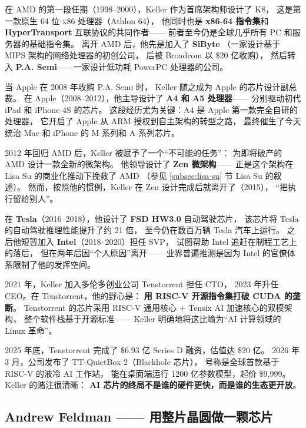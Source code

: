 在 AMD 的第一段任期（1998--2000），Keller 作为首席架构师设计了 K8，
这是第一款原生 64 位 x86 处理器（Athlon 64），
他同时也是 \textbf{x86-64 指令集}和
\textbf{HyperTransport} 互联协议的共同作者——
前者至今仍是全球几乎所有 PC 和服务器的基础指令集。
离开 AMD 后，他先是加入了 \textbf{SiByte}
（一家设计基于 MIPS 架构的网络处理器的初创公司，
后被 Broadcom 以 \$20 亿收购），
然后转入 \textbf{P.A. Semi}——一家设计低功耗 PowerPC 处理器的公司。

当 Apple 在 2008 年收购 P.A. Semi 时，
Keller 随之成为 Apple 的芯片设计副总裁。
在 Apple（2008--2012），他主导设计了 \textbf{A4 和 A5 处理器}——
分别驱动初代 iPad 和 iPhone 4S 的芯片。
这段经历尤为关键：A4 是 Apple 第一款完全自研的处理器，
它开启了 Apple 从 ARM 授权到自主架构的转型之路，
最终催生了今天统治 Mac 和 iPhone 的 M 系列和 A 系列芯片。

2012 年回归 AMD 后，Keller 被赋予了一个``不可能的任务''：
为即将破产的 AMD 设计一款全新的微架构。
他领导设计了 \textbf{Zen 微架构}——
正是这个架构在 Lisa Su 的商业化推动下挽救了 AMD
（参见 \ref{subsec:lisa-su} 节 Lisa Su 的叙述）。
然而，按照他的惯例，Keller 在 Zen 设计完成后就离开了（2015），
``把执行留给别人''。

在 \textbf{Tesla}（2016--2018），他设计了 \textbf{FSD HW3.0} 自动驾驶芯片，
该芯片将 Tesla 的自动驾驶推理性能提升了约 21 倍，
至今仍在数百万辆 Tesla 汽车上运行。
之后他短暂加入 \textbf{Intel}（2018--2020）担任 SVP，
试图帮助 Intel 追赶在制程工艺上的落后，
但在两年后因``个人原因''离开——
业界普遍推测是因为 Intel 的官僚体系限制了他的发挥空间。

2021 年，Keller 加入多伦多创业公司 Tenstorrent 担任 CTO，
2023 年升任 CEO。在 Tenstorrent，他的野心是：
\textbf{用 RISC-V 开源指令集打破 CUDA 的垄断}。
Tenstorrent 的芯片采用 RISC-V 通用核心 + Tensix AI 加速核心的双模架构，
整个软件栈基于开源标准——
Keller 明确地将这比喻为``AI 计算领域的 Linux 革命''。

2025 年底，Tenstorrent 完成了 \$6.93 亿 Series D 融资，估值达 \$20 亿。
2026 年 3 月，公司发布了 TT-QuietBox 2（Blackhole 芯片），
号称是全球首款基于 RISC-V 的液冷 AI 工作站，
能在桌面端运行 1200 亿参数模型，起价 \$9,999。
Keller 的赌注很清晰：
\textbf{AI 芯片的终局不是谁的硬件更快，而是谁的生态更开放}。

\subsection{Andrew Feldman —— 用整片晶圆做一颗芯片}
\label{subsec:feldman}

